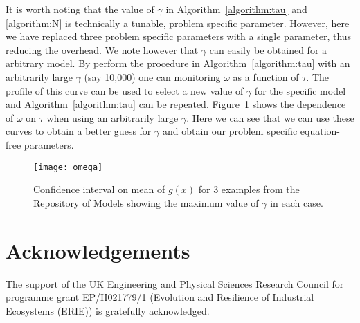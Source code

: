 \documentclass[11pt]{article}
\begin{document}
It is worth noting that the value of $\gamma$ in Algorithm~\ref{algorithm:tau} and \ref{algorithm:N} is technically a tunable, problem specific parameter. However, here we have replaced three problem specific parameters with a single parameter, thus reducing the overhead. We note however that $\gamma$ can easily be obtained for a arbitrary model. By perform the procedure in Algorithm~\ref{algorithm:tau} with an arbitrarily large $\gamma$ (say 10,000) one can monitoring $\omega$ as a function of $\tau$. The profile of this curve can be used to select a new value of $\gamma$ for the specific model and Algorithm~\ref{algorithm:tau} can be repeated. Figure~\ref{fig:omega} shows the dependence of $\omega$ on $\tau$ when using an arbitrarily large $\gamma$. Here we can see that we can use these curves to obtain a better guess for $\gamma$ and obtain our problem specific equation-free parameters. 

	\begin{figure}
		\centering
		\texttt{[image: omega]}
		\caption{Confidence interval on mean of $g(x)$ for 3 examples from the Repository of Models showing the maximum value of $\gamma$ in each case. \label{fig:omega}}
	\end{figure}	


\section*{Acknowledgements}
{The support of the UK Engineering and Physical Sciences Research Council for programme grant EP/H021779/1 (Evolution and Resilience of Industrial Ecosystems (ERIE)) is gratefully acknowledged.}
 
 
\end{document}
